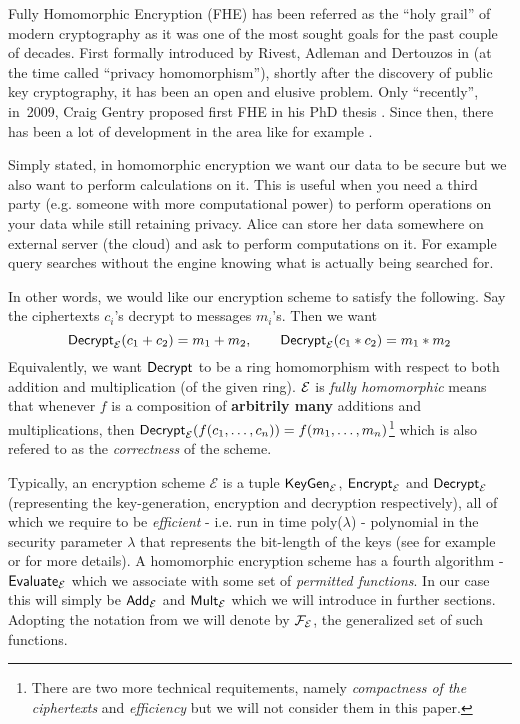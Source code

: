 Fully Homomorphic Encryption (FHE) has been referred as the ``holy grail'' of modern cryptography as it was one of the most sought goals for the past couple of decades. First formally introduced by Rivest, Adleman and Dertouzos in \cite{primal} (at the time called ``privacy homomorphism''), shortly after the discovery of public key cryptography, it has been an open and elusive problem. Only ``recently'', in~2009, Craig Gentry proposed first FHE in his PhD thesis \cite{gentry_phd}. Since then, there has been a lot of development in the area like for example .

Simply stated, in homomorphic encryption we want our data to be secure but we also want to perform calculations on it. This is useful when you need a third party (e.g. someone with more computational power) to perform operations on your data while still retaining privacy. Alice can store her data somewhere on external server (the cloud) and ask to perform computations on it. For example query searches without the engine knowing what is actually being searched for.

In other words, we would like our encryption scheme to satisfy the following. Say the ciphertexts $c_i$'s decrypt to messages $m_i$'s. Then we want
$$ \alg{Decrypt}_{\E}(c_1 + c_2) = m_1 + m_2, \qquad \alg{Decrypt}_{\E}(c_1*c_2) = m_1*m_2$$
Equivalently, we want $\alg{Decrypt}$ to be a ring homomorphism with respect to both addition and multiplication (of the given ring). $\mathcal{E}$ is \textit{fully homomorphic} means that whenever $f$ is a composition of \textbf{arbitrily many} additions and multiplications, then $\alg{Decrypt}_{\E}(f(c_1, \dots, c_n)) = f(m_1, \dots, m_n)$\footnote{There are two more technical requitements, namely \textit{compactness of the ciphertexts} and \textit{efficiency} but we will not consider them in this paper.} which is also refered to as the \textit{correctness} of the scheme.

\begin{remark} \label{algs}
    Typically, an encryption scheme $\mathcal{E}$ is a tuple $\alg{KeyGen}_{\E}$, $\alg{Encrypt}_{\E}$ and $\alg{Decrypt}_{\E}$ (representing the key-generation, encryption and decryption respectively), all of which we require to be \textit{efficient} - i.e. run in time poly($\lambda$) - polynomial in the security parameter $\lambda$ that represents the bit-length of the keys (see for example \cite{katz} or \cite{book} for more details). A homomorphic encryption scheme has a fourth algorithm - $\alg{Evaluate}_{\E}$ which we associate with some set of \textit{permitted functions}. In our case this will simply be $\alg{Add}_{\E}$ and $\alg{Mult}_{\E}$ which we will introduce in further sections. Adopting the notation from \cite{easy_fhe} we will denote by $\mathcal{F}_{\mathcal{E}}$, the generalized set of such functions.
\end{remark}

